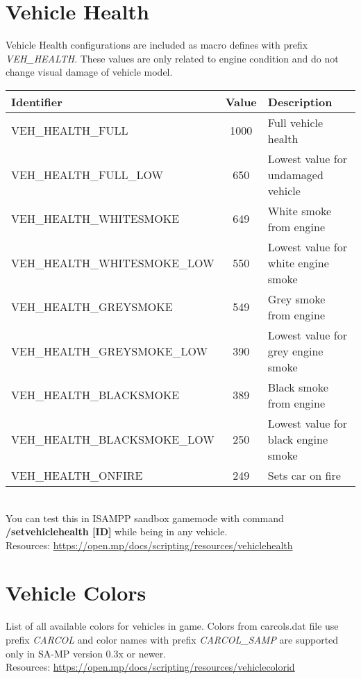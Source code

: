 \documentclass{article}
\begin{document}
\section{Vehicle Health}
\begin{sloppypar}
Vehicle Health configurations are included as macro defines with prefix \textit{VEH\_HEALTH}. These values are only related to engine condition and do not change visual damage of vehicle model.
\end{sloppypar}
\bigskip
\noindent\begin{tabular}{ |l|c|l| } 
\hline
Identifier & Value & Description \\
\hline
VEH\_HEALTH\_FULL & 1000 & Full vehicle health \\ 
VEH\_HEALTH\_FULL\_LOW & 650 &  Lowest value for undamaged vehicle \\ 
VEH\_HEALTH\_WHITESMOKE & 649 & White smoke from engine \\ 
VEH\_HEALTH\_WHITESMOKE\_LOW & 550 & Lowest value for white engine smoke \\ 
VEH\_HEALTH\_GREYSMOKE & 549 & Grey smoke from engine \\ 
VEH\_HEALTH\_GREYSMOKE\_LOW & 390 & Lowest value for grey engine smoke\\ 
VEH\_HEALTH\_BLACKSMOKE & 389 & Black smoke from engine \\ 
VEH\_HEALTH\_BLACKSMOKE\_LOW & 250 & Lowest value for black engine smoke \\ 
VEH\_HEALTH\_ONFIRE & 249 & Sets car on fire \\
\hline
\end{tabular}
\bigskip
\\You can test this in ISAMPP sandbox gamemode with command \textbf{/setvehiclehealth [ID]} while being in any vehicle.
\bigskip
\\Resources: \url{https://open.mp/docs/scripting/resources/vehiclehealth}

\section{Vehicle Colors}
List of all available colors for vehicles in game. Colors from carcols.dat file use prefix \textit{CARCOL} and color names with prefix \textit{CARCOL\_SAMP} are supported only in SA-MP version 0.3x or newer.
\bigskip
\\Resources: \url{https://open.mp/docs/scripting/resources/vehiclecolorid}
\end{document}
